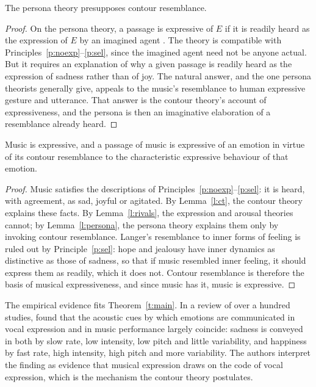 \documentclass{situationist-preprint}
\begin{document}
\begin{lemma}\label{l:persona}
The persona theory presupposes contour resemblance.
\end{lemma}

\begin{proof}
On the persona theory, a passage is expressive of $E$ if it is readily heard as the expression of $E$ by an imagined agent \citep{Levinson1996}. The theory is compatible with Principles~\ref{p:noexp}--\ref{p:sel}, since the imagined agent need not be anyone actual. But it requires an explanation of why a given passage is readily heard as the expression of sadness rather than of joy. The natural answer, and the one persona theorists generally give, appeals to the music's resemblance to human expressive gesture and utterance. That answer is the contour theory's account of expressiveness, and the persona is then an imaginative elaboration of a resemblance already heard.
\end{proof}

\begin{theorem}\label{t:main}
Music is expressive, and a passage of music is expressive of an emotion in virtue of its contour resemblance to the characteristic expressive behaviour of that emotion.
\end{theorem}

\begin{proof}
Music satisfies the descriptions of Principles~\ref{p:noexp}--\ref{p:sel}: it is heard, with agreement, as sad, joyful or agitated. By Lemma~\ref{l:ct}, the contour theory explains these facts. By Lemma~\ref{l:rivals}, the expression and arousal theories cannot; by Lemma~\ref{l:persona}, the persona theory explains them only by invoking contour resemblance. Langer's resemblance to inner forms of feeling is ruled out by Principle~\ref{p:sel}: hope and jealousy have inner dynamics as distinctive as those of sadness, so that if music resembled inner feeling, it should express them as readily, which it does not. Contour resemblance is therefore the basis of musical expressiveness, and since music has it, music is expressive.
\end{proof}

The empirical evidence fits Theorem~\ref{t:main}. In a review of over a hundred studies, \citet{JuslinLaukka2003} found that the acoustic cues by which emotions are communicated in vocal expression and in music performance largely coincide: sadness is conveyed in both by slow rate, low intensity, low pitch and little variability, and happiness by fast rate, high intensity, high pitch and more variability. The authors interpret the finding as evidence that musical expression draws on the code of vocal expression, which is the mechanism the contour theory postulates.
\end{document}
